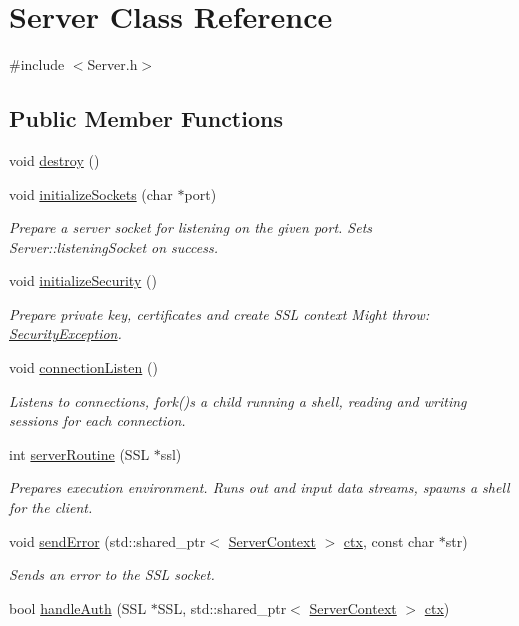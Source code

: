 \hypertarget{classServer}{}\section{Server Class Reference}
\label{classServer}


{\ttfamily \#include $<$Server.\+h$>$}

\subsection*{Public Member Functions}
\begin{DoxyCompactItemize}
\item 
void \hyperlink{classServer_adce993ab4cce22dc732bddddf310a5f6}{destroy} ()
\item 
void \hyperlink{classServer_afee42c59df0ce3e03fa5d6ed2b1cdccc}{initialize\+Sockets} (char $\ast$port)
\begin{DoxyCompactList}\small\item\em Prepare a server socket for listening on the given port. Sets Server\+::listening\+Socket on success. \end{DoxyCompactList}\item 
void \hyperlink{classServer_a54da775247c049b9cc78c92946bb058a}{initialize\+Security} ()
\begin{DoxyCompactList}\small\item\em Prepare private key, certificates and create S\+SL context Might throw\+: \hyperlink{classSecurityException}{Security\+Exception}. \end{DoxyCompactList}\item 
void \hyperlink{classServer_a258c0a0a42d0be99bc4a36b4e6212ed2}{connection\+Listen} ()
\begin{DoxyCompactList}\small\item\em Listens to connections, fork()\textquotesingle{}s a child running a shell, reading and writing sessions for each connection. \end{DoxyCompactList}\item 
int \hyperlink{classServer_a47b6e405d109cdd27838220684f0e2e5}{server\+Routine} (S\+SL $\ast$ssl)
\begin{DoxyCompactList}\small\item\em Prepares execution environment. Runs out and input data streams, spawns a shell for the client. \end{DoxyCompactList}\item 
void \hyperlink{classServer_abc80f4931ae5b5860a9f70ffac1b89c5}{send\+Error} (std\+::shared\+\_\+ptr$<$ \hyperlink{structServerContext}{Server\+Context} $>$ \hyperlink{shell_2src_2main_8cpp_aabb454f84e785177301ba543d88067a7}{ctx}, const char $\ast$str)
\begin{DoxyCompactList}\small\item\em Sends an error to the S\+SL socket. \end{DoxyCompactList}\item 
bool \hyperlink{classServer_a7d999a07f62d1d3d7dff37b6935c01a6}{handle\+Auth} (S\+SL $\ast$S\+SL, std\+::shared\+\_\+ptr$<$ \hyperlink{structServerContext}{Server\+Context} $>$ \hyperlink{shell_2src_2main_8cpp_aabb454f84e785177301ba543d88067a7}{ctx})
\end{DoxyCompactItemize}
